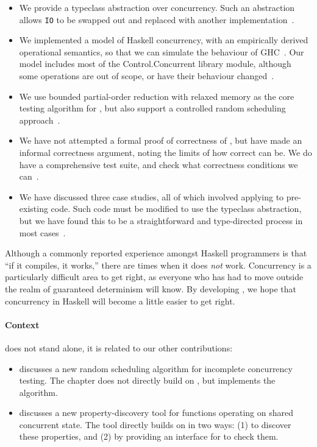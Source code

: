 \begin{itemize}
\item We provide a typeclass abstraction over concurrency.  Such an
  abstraction allows \verb|IO| to be swapped out and replaced with
  another implementation~.

\item We implemented a model of Haskell concurrency, with an
  empirically derived operational semantics, so that we can simulate
  the behaviour of GHC~.  Our model includes
  most of the Control.Concurrent library module, although some
  operations are out of scope, or have their behaviour
  changed~.

\item We use bounded partial-order reduction\cite{coons2013} with
  relaxed memory\cite{zhang2015} as the core testing algorithm for
  \dejafu{}, but also support a controlled random scheduling
  approach~.

\item We have not attempted a formal proof of correctness of
  \dejafu{}, but have made an informal correctness argument, noting
  the limits of how correct \dejafu{} can be.  We do have a
  comprehensive test suite, and check what correctness conditions we
  can~.

\item We have discussed three case studies, all of which involved
  applying \dejafu{} to pre-existing code.  Such code must be modified
  to use the \dejafu{} typeclass abstraction, but we have found this
  to be a straightforward and type-directed process in most
  cases~.
\end{itemize}

Although a commonly reported experience amongst Haskell programmers is
that ``if it compiles, it works,'' there are times when it does
\emph{not} work.  Concurrency is a particularly difficult area to get
right, as everyone who has had to move outside the realm of guaranteed
determinism will know.  By developing \dejafu{}, we hope that
concurrency in Haskell will become a little easier to get right.

\paragraph{Context}
\dejafu{} does not stand alone, it is related to our other
contributions:

\begin{itemize}
\item {} discusses a new random scheduling
  algorithm for incomplete concurrency testing.  The chapter does not
  directly build on \dejafu{}, but \dejafu{} implements the algorithm.
\item {} discusses a new property-discovery tool for
  functions operating on shared concurrent state.  The tool directly
  builds on \dejafu{} in two ways: (1) to discover these properties,
  and (2) by providing an interface for \dejafu{} to check them.
\end{itemize}
